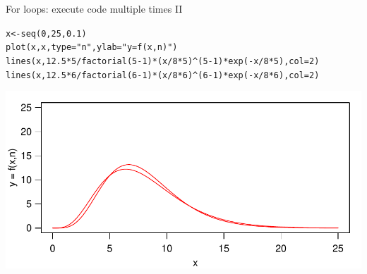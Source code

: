 \documentclass[xcolor=table,      handout ,    xcolor=dvipsnames]{beamer}\usepackage[]{graphicx}\usepackage[]{color}
\makeatletter
\newcommand{\hlnum}[1]{\textcolor[rgb]{0,0,0}{#1}}
\newcommand{\hlstr}[1]{\textcolor[rgb]{0.545,0.137,0.137}{#1}}
\newcommand{\hlopt}[1]{\textcolor[rgb]{0,0,0}{#1}}
\newcommand{\hlstd}[1]{\textcolor[rgb]{0,0,0}{#1}}
\newcommand{\hlkwb}[1]{\textcolor[rgb]{0,0,0}{#1}}
\newcommand{\hlkwc}[1]{\textcolor[rgb]{1,0,1}{#1}}
\newcommand{\hlkwd}[1]{\textcolor[rgb]{0,0,1}{#1}}
\newenvironment{kframe}{%
 \def\at@end@of@kframe{}%
 \ifinner\ifhmode%
  \def\at@end@of@kframe{\end{minipage}}%
  \begin{minipage}{\columnwidth}%
 \fi\fi%
 \def\FrameCommand##1{\hskip\@totalleftmargin \hskip-\fboxsep
 \colorbox{shadecolor}{##1}\hskip-\fboxsep
     \hskip-\linewidth \hskip-\@totalleftmargin \hskip\columnwidth}%
 \MakeFramed {\advance\hsize-\width
   \@totalleftmargin\z@ \linewidth\hsize
   \@setminipage}}%
 {\par\unskip\endMakeFramed%
 \at@end@of@kframe}
\newenvironment{knitrout}{}{} %
\makeatother
\begin{document}
\begin{frame}[fragile]{For loops: execute code multiple times II}
\begin{knitrout}\footnotesize
{}\color{fgcolor}\begin{kframe}
\begin{alltt}
\hlstd{x} \hlkwb{<-} \hlkwd{seq}\hlstd{(}\hlnum{0}\hlstd{,}\hlnum{25}\hlstd{,}\hlnum{0.1}\hlstd{)}
\hlkwd{plot}\hlstd{(x,x,} \hlkwc{type}\hlstd{=}\hlstr{"n"}\hlstd{,} \hlkwc{ylab}\hlstd{=}\hlstr{"y = f(x,n)"}\hlstd{)}
\hlkwd{lines}\hlstd{(x,} \hlnum{12.5}\hlopt{*}\hlnum{5}\hlopt{/}\hlkwd{factorial}\hlstd{(}\hlnum{5}\hlopt{-}\hlnum{1}\hlstd{)}\hlopt{*}\hlstd{(x}\hlopt{/}\hlnum{8}\hlopt{*}\hlnum{5}\hlstd{)}\hlopt{^}\hlstd{(}\hlnum{5}\hlopt{-}\hlnum{1}\hlstd{)}\hlopt{*}\hlkwd{exp}\hlstd{(}\hlopt{-}\hlstd{x}\hlopt{/}\hlnum{8}\hlopt{*}\hlnum{5}\hlstd{),} \hlkwc{col}\hlstd{=}\hlnum{2}\hlstd{)}
\hlkwd{lines}\hlstd{(x,} \hlnum{12.5}\hlopt{*}\hlnum{6}\hlopt{/}\hlkwd{factorial}\hlstd{(}\hlnum{6}\hlopt{-}\hlnum{1}\hlstd{)}\hlopt{*}\hlstd{(x}\hlopt{/}\hlnum{8}\hlopt{*}\hlnum{6}\hlstd{)}\hlopt{^}\hlstd{(}\hlnum{6}\hlopt{-}\hlnum{1}\hlstd{)}\hlopt{*}\hlkwd{exp}\hlstd{(}\hlopt{-}\hlstd{x}\hlopt{/}\hlnum{8}\hlopt{*}\hlnum{6}\hlstd{),} \hlkwc{col}\hlstd{=}\hlnum{2}\hlstd{)}
\end{alltt}
\end{kframe}

{\centering \includegraphics[width=\textwidth]{./fig/for3-1} 

}




\end{knitrout}
\end{frame}
\end{document}

